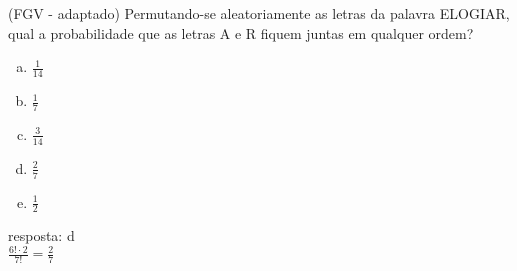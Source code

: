 \begin{ex}
 (FGV - adaptado) Permutando-se aleatoriamente as letras da palavra ELOGIAR, qual a probabilidade que as letras A e R fiquem juntas em qualquer ordem?
    \begin{enumerate}[(a)]
    \item $\frac{1}{14}$
    \item $\frac{1}{7}$
    \item $\frac{3}{14}$
    \item $\frac{2}{7}$
    \item $\frac{1}{2}$
    \end{enumerate}
       \begin{sol}
       resposta: d \\
       $\frac{6!\cdot2}{7!}=\frac{2}{7}$
       \end{sol}
    
\end{ex}